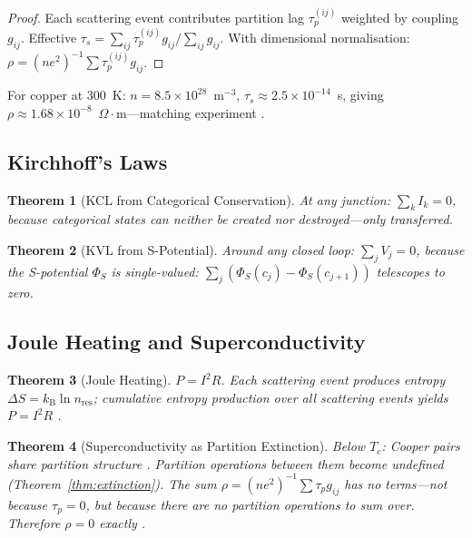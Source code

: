\documentclass[11pt,twocolumn,a4paper]{article}
\newtheorem{theorem}{Theorem}[section]
\theoremstyle{definition}
\theoremstyle{remark}
\newcommand{\kB}{k_{\mathrm{B}}}
\newcommand{\taup}{\tau_p}
\newcommand{\Spotential}{\Phi_S}
\begin{document}
\begin{proof}
Each scattering event contributes partition lag $\taup^{(ij)}$ weighted by coupling $g_{ij}$. Effective $\tau_s = \sum_{ij}\taup^{(ij)}g_{ij}/\sum_{ij}g_{ij}$. With dimensional normalisation: $\rho = (ne^2)^{-1}\sum\taup^{(ij)}g_{ij}$.
\end{proof}

For copper at 300~K: $n = 8.5\times 10^{28}$~m$^{-3}$, $\tau_s \approx 2.5\times 10^{-14}$~s, giving $\rho \approx 1.68\times 10^{-8}$~$\Omega\cdot$m---matching experiment \citep{haynes2016}.

\subsection{Kirchhoff's Laws}

\begin{theorem}[KCL from Categorical Conservation]
At any junction: $\sum_k I_k = 0$, because categorical states can neither be created nor destroyed---only transferred.
\end{theorem}

\begin{theorem}[KVL from S-Potential]
Around any closed loop: $\sum_j V_j = 0$, because the S-potential $\Spotential$ is single-valued: $\sum_j (\Spotential(c_j) - \Spotential(c_{j+1}))$ telescopes to zero.
\end{theorem}

\subsection{Joule Heating and Superconductivity}

\begin{theorem}[Joule Heating]
$P = I^2R$. Each scattering event produces entropy $\Delta S = \kB\ln n_{\mathrm{res}}$; cumulative entropy production over all scattering events yields $P = I^2R$ \citep{boltzmann1877}.
\end{theorem}

\begin{theorem}[Superconductivity as Partition Extinction]
Below $T_c$: Cooper pairs share partition structure \citep{BCS1957}. Partition operations between them become undefined (Theorem~\ref{thm:extinction}). The sum $\rho = (ne^2)^{-1}\sum\taup g_{ij}$ has \emph{no terms}---not because $\taup = 0$, but because there are no partition operations to sum over. Therefore $\rho = 0$ exactly \citep{onnes1911}.
\end{theorem}
\end{document}
